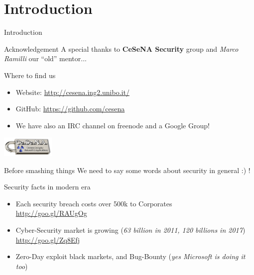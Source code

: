 \section{Introduction}

\begin{frame}{Introduction}

\begin{block}{Acknowledgement}
A special thanks to {\bf CeSeNA Security} group and \emph{Marco Ramilli} our ``old'' mentor...
\end{block}

\begin{block}{Where to find us}
\begin{itemize}
\item Website: {\small \url{http://cesena.ing2.unibo.it/}}
\item GitHub: {\small \url{https://github.com/cesena}}
\item We have also an IRC channel on freenode and a Google Group!
\end{itemize}
\begin{flushright}
\includegraphics[height=1cm]{imgs/CeSeNA.png}
\end{flushright}
\end{block}

\framebreak

\begin{block}{Before smashing things}
We need to say some words about security in general :) !
\end{block}

\framebreak

\begin{block}{Security facts in modern era}
\begin{itemize}
\item Each security breach costs over 500k to Corporates\\
{\small \url{http://goo.gl/RAUgOg}}
\item Cyber-Security market is growing (\emph{63 billion in 2011, 120 billions in 2017})\\ {\small \url{http://goo.gl/Zq8Efj}}
\item Zero-Day exploit black markets, and Bug-Bounty (\emph{yes Microsoft is doing it too})
\end{itemize}
\end{block}


\end{frame}
